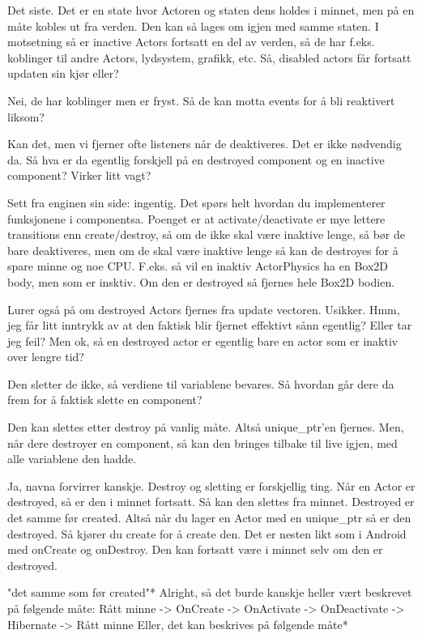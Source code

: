 Det siste. Det er en state hvor Actoren og staten dens holdes i minnet, men på en måte kobles ut fra verden. Den kan så lages om igjen med samme staten. I motsetning så er inactive Actors fortsatt en del av verden, så de har f.eks. koblinger til andre Actors, lydsystem, grafikk, etc.
Så, disabled actors får fortsatt updaten sin kjør eller?

Nei, de har koblinger men er fryst.
Så de kan motta events for å bli reaktivert liksom?

Kan det, men vi fjerner ofte listeners når de deaktiveres. Det er ikke nødvendig da.
Så hva er da egentlig forskjell på en destroyed component og en inactive component? Virker litt vagt?

Sett fra enginen sin side: ingentig. Det spørs helt hvordan du implementerer funksjonene i componentsa. Poenget er at activate/deactivate er mye lettere transitions enn create/destroy, så om de ikke skal være inaktive lenge, så bør de bare deaktiveres, men om de skal være inaktive lenge så kan de destroyes for å spare minne og noe CPU. F.eks. så vil en inaktiv ActorPhysics ha en Box2D body, men som er insktiv. Om den er destroyed så fjernes hele Box2D bodien.

Lurer også på om destroyed Actors fjernes fra update vectoren. Usikker.
Hmm, jeg får litt inntrykk av at den faktisk blir fjernet effektivt sånn egentlig?
Eller tar jeg feil?
Men ok, så en destroyed actor er egentlig bare en actor som er inaktiv over lengre tid?

Den sletter de ikke, så verdiene til variablene bevares.
Så hvordan går dere da frem for å faktisk slette en component?

Den kan slettes etter destroy på vanlig måte. Altså unique_ptr'en fjernes.
Men, når dere destroyer en component, så kan den bringes tilbake til live igjen, med alle variablene den hadde.

Ja, navna forvirrer kanskje. Destroy og sletting er forskjellig ting. Når en Actor er destroyed, så  er den i minnet fortsatt. Så kan den slettes fra minnet. Destroyed er det samme før created. Altså når du lager en Actor med en unique_ptr så er den destroyed. Så kjører du create for å create den. Det er nesten likt som i Android med onCreate og onDestroy. Den kan fortsatt være i minnet selv om den er destroyed.

"det samme som før created"*
Alright, så det burde kanskje heller vært beskrevet på følgende måte: 
Rått minne -> OnCreate -> OnActivate -> OnDeactivate -> Hibernate -> Rått minne
Eller, det kan beskrives på følgende måte*

